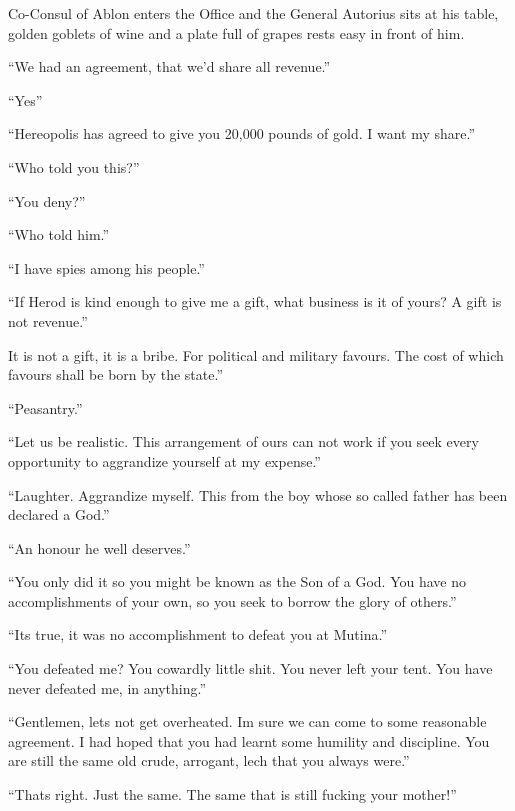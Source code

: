 \pagecolor{gray}\afterpage{\nopagecolor}
\selectfont
Co-Consul of Ablon enters the Office and the General Autorius sits at his table, golden goblets of wine and a plate full of grapes rests easy in front of him. 

``We had an agreement, that we'd share all revenue.''

``Yes''

``Hereopolis has agreed to give you 20,000 pounds of gold. I want my share.''

``Who told you this?''

``You deny?''

``Who told him.''

``I have spies among his people.''

``If Herod is kind enough to give me a gift, what business is it of yours? A gift is not revenue.''

It is not a gift, it is a bribe. For political and military favours. The cost of which favours shall be born by the state.''

``Peasantry.''

``Let us be realistic. This arrangement of ours can not work if you seek every opportunity to aggrandize yourself at my expense.''

``Laughter. Aggrandize myself. This from the boy whose so called father has been declared a God.''

``An honour he well deserves.''

``You only did it so you might be known as the Son of a God. You have no accomplishments of your own, so you seek to borrow the glory of others.''

``Its true, it was no accomplishment to defeat you at Mutina.''

``You defeated me? You cowardly little shit. You never left your tent. You have never defeated me, in anything.''

``Gentlemen, lets not get overheated. Im sure we can come to some reasonable agreement. I had hoped that you had learnt some humility and discipline. You are still the same old crude, arrogant, lech that you always were.''

``Thats right. Just the same. The same that is still fucking your mother!''
\normalfont